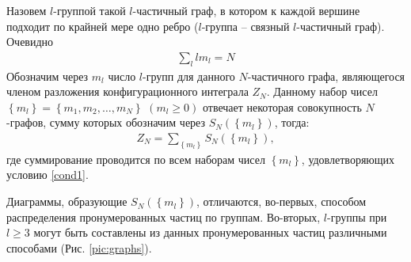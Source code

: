 Назовем $l$-группой такой $l$-частичный граф, в котором к каждой вершине подходит по крайней мере одно ребро ($l$-группа -- связный $l$-частичный граф). Очевидно
\vverh
\begin{gather}
	\sum_l l m_l = N \label{cond1}
\end{gather}
Обозначим через $m_l$ число $l$-групп для данного $N$-частичного графа, являющегося членом разложения конфигурационного интеграла $Z_N$. Данному набор чисел $\left\{ m_l \right\} = \left\{ m_1 , m_2 , \dots, m_N \right\}$ $( m_l \geqslant 0 )$ отвечает некоторая совокупность $N$-графов, сумму которых обозначим через $S_N \left( \left\{ m_l \right\} \right)$, тогда:
\vverh
\begin{gather}
	Z_N = \sum_{ \left\{ m_l \right\} } S_N \left( \left\{ m_l \right\} \right), \label{confsum}
\end{gather}
где суммирование проводится по всем наборам чисел $\left\{ m_l \right\}$, удовлетворяющих условию \eqref{cond1}. \par
Диаграммы, образующие $S_N \left( \left\{ m_l \right\} \right)$, отличаются, во-первых, способом распределения пронумерованных частиц по группам. Во-вторых, $l$-группы при $l \geqslant 3$ могут быть составлены из данных пронумерованных частиц различными способами (Рис. \ref{pic:graphs}).
\vverh
